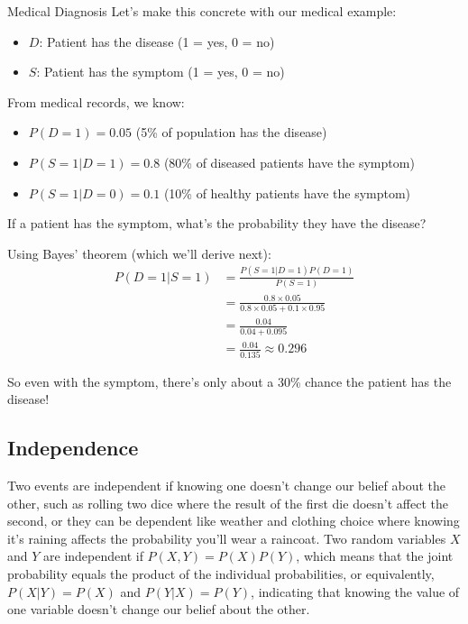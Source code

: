 \begin{examplebox}{Medical Diagnosis}
Let's make this concrete with our medical example:
\begin{itemize}
    \item $D$: Patient has the disease (1 = yes, 0 = no)
    \item $S$: Patient has the symptom (1 = yes, 0 = no)
\end{itemize}

From medical records, we know:
\begin{itemize}
    \item $P(D=1) = 0.05$ (5\% of population has the disease)
    \item $P(S=1|D=1) = 0.8$ (80\% of diseased patients have the symptom)
    \item $P(S=1|D=0) = 0.1$ (10\% of healthy patients have the symptom)
\end{itemize}

If a patient has the symptom, what's the probability they have the disease?

Using Bayes' theorem (which we'll derive next):
\begin{align}
P(D=1|S=1) &= \frac{P(S=1|D=1)P(D=1)}{P(S=1)} \\
&= \frac{0.8 \times 0.05}{0.8 \times 0.05 + 0.1 \times 0.95} \\
&= \frac{0.04}{0.04 + 0.095} \\
&= \frac{0.04}{0.135} \approx 0.296
\end{align}

So even with the symptom, there's only about a 30\% chance the patient has the disease!
\end{examplebox}

\subsection{Independence}

Two events are independent if knowing one doesn't change our belief about the other, such as rolling two dice where the result of the first die doesn't affect the second, or they can be dependent like weather and clothing choice where knowing it's raining affects the probability you'll wear a raincoat. Two random variables $X$ and $Y$ are independent if $P(X, Y) = P(X)P(Y)$, which means that the joint probability equals the product of the individual probabilities, or equivalently, $P(X|Y) = P(X)$ and $P(Y|X) = P(Y)$, indicating that knowing the value of one variable doesn't change our belief about the other.

